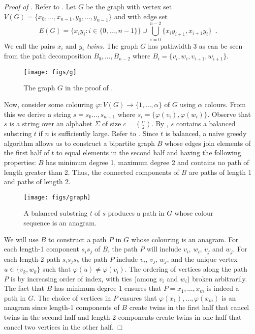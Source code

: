 \documentclass{patmorin}
\begin{document}
\begin{proof}[Proof of ]
Refer to .
Let $G$ be the graph with vertex set
$V(G)=\{x_0,\ldots,x_{n-1},y_0,\ldots,y_{n-1}\}$ and with edge set
\[
  E(G) = \{x_iy_i : i\in\{0,\ldots,n-1\}\} \cup \bigcup_{i=0}^{n-2} \{x_iy_{i+1},x_{i+1}y_i\} \enspace .
\]
We call the pairs $x_i$ and $y_i$ \emph{twins}.
The graph $G$ has pathwidth 3 as can be seen from the path decomposition $B_0,\ldots,B_{n-2}$ where $B_i=\{v_i,w_i,v_{i+1},w_{i+1}\}$.

\begin{figure}
  \begin{center}
    \texttt{[image: figs/g]}
  \end{center}
  \caption{The graph $G$ in the proof of .}
\end{figure}

Now, consider some colouring $\varphi:V(G)\to\{1,\ldots,\alpha\}$ of $G$
using $\alpha$ colours. From this we derive a string $s=s_0\ldots,s_{n-1}$
where $s_i=\{\varphi(v_i),\varphi(w_i)\}$.  Observe that $s$ is
a string over an alphabet $\Sigma$ of size $c=\binom{\alpha}{2}$.
By , $s$ contains a balanced substring $t$ if $n$
is sufficiently large.  Refer to . Since $t$
is balanced, a na\"ive greedy algorithm allows us to construct a bipartite
 graph $B$ whose edges join
elements of the first half of $t$ to equal elements in the second half
and having the following properties: $B$ has minimum degree 1, maximum
degree 2 and contains no path of length greater than 2.  Thus, the
connected components of $B$ are paths of length 1 and paths of length 2.

\begin{figure}
  \begin{center}
    \texttt{[image: figs/graph]}
  \end{center}
  \caption{A balanced substring $t$ of $s$ produces a path in $G$ whose
    colour sequence is an anagram.}
\end{figure}



We will use $B$ to construct a path $P$ in $G$ whose colouring is an
anagram.  For each length-1 component $s_is_j$ of $B$, the path $P$
will include $v_i$, $w_i$, $v_j$ and $w_j$.  For each length-2 path
$s_is_js_k$ the path $P$ include $v_i$, $v_j$, $w_j$, and the unique
vertex $u\in\{v_k,w_k\}$ such that $\varphi(u)\neq \varphi(v_i)$.
The ordering of vertices along the path $P$ is by increasing order
of index, with ties (among $v_i$ and $w_i$) broken arbitrarily.
The fact that $B$ has minimum degree 1 ensures that $P=x_1,\ldots,x_m$
is indeed a path in $G$.  The choice of vertices in $P$ ensures that
$\varphi(x_1),\ldots,\varphi(x_m)$ is an anagram since length-1 components
of $B$ create twins in the first half that cancel twins in the second
half and length-2 components create twins in one half that cancel two
vertices in the other half.
\end{proof}
\end{document}
